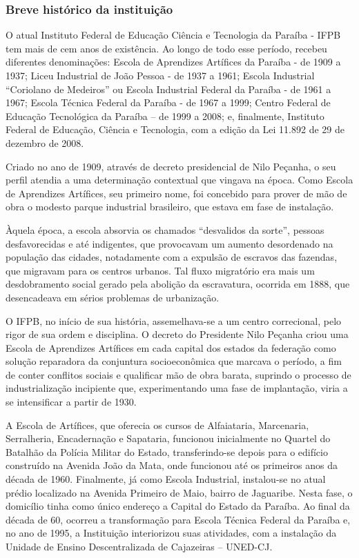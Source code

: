 \subsubsection{Breve histórico da instituição}


	O atual Instituto Federal de Educação Ciência e Tecnologia da Paraíba - IFPB tem mais de cem anos de existência. Ao longo de todo esse período, recebeu diferentes denominações: Escola de Aprendizes Artífices da Paraíba - de 1909 a 1937; Liceu Industrial de João Pessoa - de 1937 a 1961; Escola Industrial ``Coriolano de Medeiros'' ou Escola Industrial Federal da Paraíba - de 1961 a 1967; Escola Técnica Federal da Paraíba - de 1967 a 1999; Centro Federal de Educação Tecnológica da Paraíba – de 1999 a 2008; e, finalmente, Instituto Federal de Educação, Ciência e Tecnologia, com a edição da Lei 11.892 de 29 de dezembro de 2008.	
	
	Criado no ano de 1909, através de decreto presidencial de Nilo Peçanha, o seu perfil atendia a uma determinação contextual que vingava na época. Como Escola de Aprendizes Artífices, seu primeiro nome, foi concebido para prover de mão de obra o modesto parque industrial brasileiro, que estava em fase de instalação.
	
	Àquela época, a escola absorvia os chamados ``desvalidos da sorte'', pessoas desfavorecidas e até indigentes, que provocavam um aumento desordenado na população das cidades, notadamente com a expulsão de escravos das fazendas, que migravam para os centros urbanos. Tal fluxo migratório era mais um desdobramento social gerado pela abolição da escravatura, ocorrida em 1888, que desencadeava em sérios problemas de urbanização.
	
	O IFPB, no início de sua história, assemelhava-se a um centro correcional, pelo rigor de sua ordem e disciplina. O decreto do Presidente Nilo Peçanha criou uma Escola de Aprendizes Artífices em cada capital dos estados da federação como solução reparadora da conjuntura socioeconômica que marcava o período, a fim de conter conflitos sociais e qualificar mão de obra barata, suprindo o processo de industrialização incipiente que, experimentando uma fase de implantação, viria a se intensificar a partir de 1930.
	
	A Escola de Artífices, que oferecia os cursos de Alfaiataria, Marcenaria, Serralheria, Encadernação e Sapataria, funcionou inicialmente no Quartel do Batalhão da Polícia Militar do Estado, transferindo-se depois para o edifício construído na Avenida João da Mata, onde funcionou até os primeiros anos da década de 1960. Finalmente, já como Escola Industrial, instalou-se no atual prédio localizado na Avenida Primeiro de Maio, bairro de Jaguaribe. Nesta fase, o domicílio tinha como único endereço a Capital do Estado da Paraíba. Ao final da década de 60, ocorreu a transformação para Escola Técnica Federal da Paraíba e, no ano de 1995, a Instituição interiorizou suas atividades, com a instalação da Unidade de Ensino Descentralizada de Cajazeiras – UNED-CJ.
	
